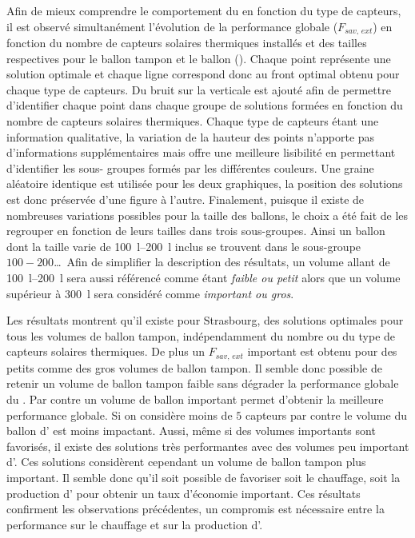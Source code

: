 Afin de mieux comprendre le comportement du  en fonction du type de capteurs, il
est observé simultanément l’évolution de la performance globale ($F_{sav,\, ext}$) en
fonction du nombre de capteurs solaires thermiques installés et des tailles respectives
pour le ballon tampon et le ballon  ().
Chaque point représente une solution optimale et chaque ligne correspond donc au front
optimal obtenu pour chaque type de capteurs. Du bruit sur la verticale est ajouté afin de
permettre d’identifier chaque point dans chaque groupe de solutions formées en fonction du
nombre de capteurs solaires thermiques. Chaque type de capteurs étant une information
qualitative, la variation de la hauteur des points n’apporte pas d’informations
supplémentaires mais offre une meilleure lisibilité en permettant d’identifier les sous-
groupes formés par les différentes couleurs. Une graine aléatoire identique est utilisée
pour les deux graphiques, la position des solutions est donc préservée d’une figure à
l’autre. Finalement, puisque il existe de nombreuses variations possibles pour la taille
des ballons, le choix a été fait de les regrouper en fonction de leurs tailles dans trois
sous-groupes. Ainsi un ballon dont la taille varie de \SIrange{100}{200}{\litre} inclus se
trouvent dans le sous-groupe $100-200$\dots\ Afin de simplifier la description des résultats,
un volume allant de \SIrange{100}{200}{\litre} sera aussi référencé comme étant
\emph{faible ou petit} alors que un volume supérieur à \SI{300}{\litre} sera considéré
comme \emph{important ou gros}.

Les résultats montrent qu’il existe pour Strasbourg, des solutions optimales pour tous les volumes de
ballon tampon, indépendamment du nombre ou du type de capteurs solaires thermiques. De
plus un $F_{sav,\, ext}$ important est obtenu pour des petits comme des gros volumes de
ballon tampon. Il semble donc possible de retenir un volume de ballon tampon faible sans
dégrader la performance globale du . Par contre un volume de ballon 
important permet d’obtenir la meilleure performance globale. Si on considère moins de $5$
capteurs par contre le volume du ballon d’ est moins impactant. Aussi,
même si des volumes importants sont favorisés, il existe des solutions très
performantes avec des volumes peu important d’. Ces solutions considèrent
cependant un volume de ballon tampon plus important. Il semble donc qu’il soit possible de
favoriser soit le chauffage, soit la production d’ pour obtenir un taux
d’économie important. Ces résultats confirment les observations précédentes, un compromis
est nécessaire entre la performance sur le chauffage et sur la production d’.

